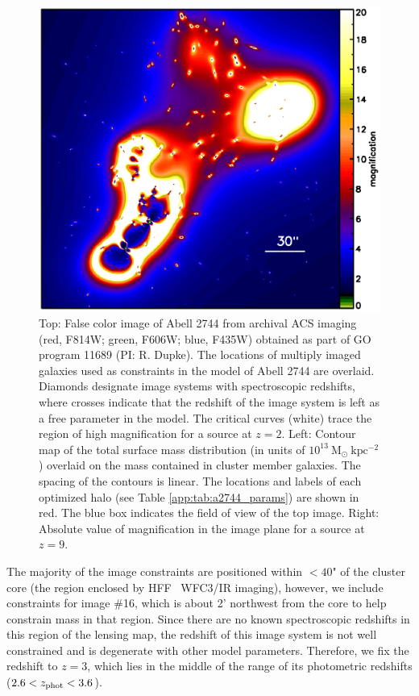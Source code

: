 \begin{figure}[h]
\includegraphics[height=0.28\textheight]{Chap2/c2f1c.eps}
\caption[Abell 2744 image constraints and critical curves]{Top: False color image of Abell 2744 from archival ACS imaging (red, F814W; green, F606W; blue, F435W) obtained as part of GO program 11689 (PI: R. Dupke). The locations of multiply imaged galaxies used as constraints in the model of Abell 2744 are overlaid. Diamonds designate image systems with spectroscopic redshifts, where crosses indicate that the redshift of the image system is left as a free parameter in the model. The critical curves (white) trace the region of high magnification for a source at $z=2$. Left: Contour map of the total surface mass distribution (in units of $10^{13}\ \mathrm{M_\odot \ kpc^{-2}}$) overlaid on the mass contained in cluster member galaxies. The spacing of the contours is linear. The locations and labels of each optimized halo (see Table \ref{app:tab:a2744_params}) are shown in red. The blue box indicates the field of view of the top image. Right: Absolute value of magnification in the image plane for a source at $z=9$.}
\label{chap2:fig:crit_a2744}
\end{figure}

The majority of the image constraints are positioned within $<40$" of the cluster core (the region enclosed by HFF \hst\ WFC3/IR imaging), however, we include constraints for image \#16, which is about 2' northwest from the core to help constrain mass in that region. Since there are no known spectroscopic redshifts in this region of the lensing map, the redshift of this image system is not well constrained and is degenerate with other model parameters. Therefore, we fix the redshift to $z=3$, which lies in the middle of the range of its photometric redshifts ($2.6<z_\mathrm{phot}<3.6$).

